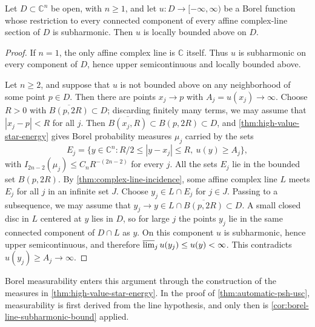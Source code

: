 \begin{corollary}\label{cor:borel-line-subharmonic-bound}
Let $D\subset\mathbb C^n$ be open, with $n\geq1$, and let $u\colon D\to[-\infty,\infty)$ be a Borel function whose restriction to every connected component of every affine complex-line section of $D$ is subharmonic. Then $u$ is locally bounded above on $D$.
\end{corollary}
\begin{proof}
If $n=1$, the only affine complex line is $\mathbb C$ itself. Thus $u$ is subharmonic on every component of $D$, hence upper semicontinuous and locally bounded above.

Let $n\geq2$, and suppose that $u$ is not bounded above on any neighborhood of some point $p\in D$. Then there are points $x_j\to p$ with $A_j=u(x_j)\to\infty$. Choose $R>0$ with $\overline{B(p,2R)}\subset D$; discarding finitely many terms, we may assume that $|x_j-p|<R$ for all $j$. Then $\overline{B(x_j,R)}\subset B(p,2R)\subset D$, and \cref{thm:high-value-star-energy} gives Borel probability measures $\mu_j$ carried by the sets
\[
 E_j=\{y\in\mathbb C^n:R/2\leq|y-x_j|\leq R,\ u(y)\geq A_j\},
\]
with $I_{2n-2}(\mu_j)\leq C_nR^{-(2n-2)}$ for every $j$. All the sets $E_j$ lie in the bounded set $B(p,2R)$. By \cref{thm:complex-line-incidence}, some affine complex line $L$ meets $E_j$ for all $j$ in an infinite set $J$. Choose $y_j\in L\cap E_j$ for $j\in J$. Passing to a subsequence, we may assume that $y_j\to y\in L\cap\overline{B(p,2R)}\subset D$. A small closed disc in $L$ centered at $y$ lies in $D$, so for large $j$ the points $y_j$ lie in the same connected component of $D\cap L$ as $y$. On this component $u$ is subharmonic, hence upper semicontinuous, and therefore $\varlimsup_ju(y_j)\leq u(y)<\infty$. This contradicts $u(y_j)\geq A_j\to\infty$.
\end{proof}

Borel measurability enters this argument through the construction of the measures in \cref{thm:high-value-star-energy}. In the proof of \cref{thm:automatic-psh-usc}, measurability is first derived from the line hypothesis, and only then is \cref{cor:borel-line-subharmonic-bound} applied.
